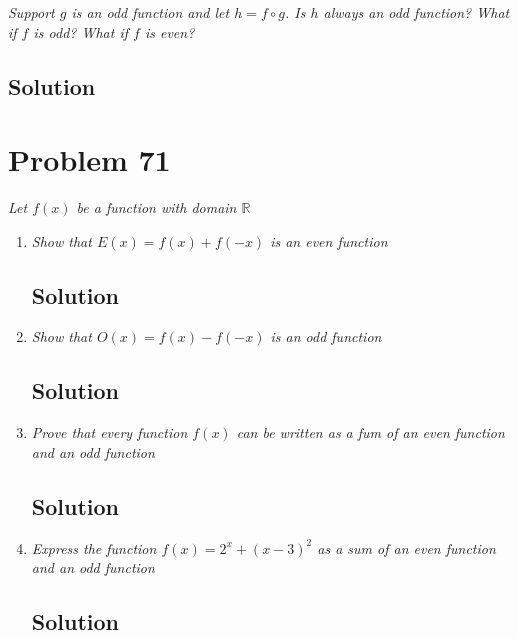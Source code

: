 \documentclass[11pt]{article}
\newcommand{\soln}{\subsection*}
\newcommand{\qn}{\textit}
\begin{document}
\qn{Support $g$ is an odd function and let $h=f \circ g$. Is $h$ always an odd function? What if $f$ is odd? What if $f$ is even?}

\soln{Solution}

\section*{Problem 71}

\qn{Let $f(x)$ be a function with domain $\mathbb{R}$}

\begin{enumerate}
	\item \qn{Show that $E(x)=f(x)+f(-x)$ is an even function}
	\soln{Solution}
	
	\item \qn{Show that $O(x)=f(x)-f(-x)$ is an odd function}
	\soln{Solution}
	
	\item \qn{Prove that every function $f(x)$ can be written as a fum of an even function and an odd function}
	\soln{Solution}
	
	\item \qn{Express the function $f(x)=2^x+(x-3)^2$ as a sum of an even function and an odd function}
	\soln{Solution}
\end{enumerate}
	
\end{document}
